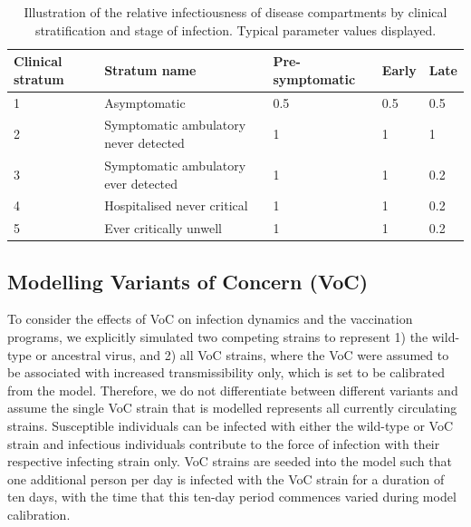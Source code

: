 \begin{table}[ht]
\renewcommand{\baselinestretch}{1}
    \begin{tabular}{| p{2cm} | p{6.6cm} | p{2.5cm} | l | l |}
    	\hline
        \textbf{Clinical stratum} & \textbf{Stratum name} & \textbf{Pre-symptomatic} &\textbf{Early} & \textbf{Late}\\
        \hline
        1 & Asymptomatic & \cellcolor[HTML]{DC6464}\textcolor[HTML]{FFFFFF}{0.5} & 
        \cellcolor[HTML]{DC6464}\textcolor[HTML]{FFFFFF}{0.5} & \cellcolor[HTML]{DC6464}\textcolor[HTML]{FFFFFF}{0.5} \\
        2 & Symptomatic ambulatory never detected & \cellcolor[HTML]{C90000}\textcolor[HTML]{FFFFFF}{1} & \cellcolor[HTML]{C90000}\textcolor[HTML]{FFFFFF}{1} & \cellcolor[HTML]{C90000}\textcolor[HTML]{FFFFFF}{1} \\
        3 & Symptomatic ambulatory ever detected & \cellcolor[HTML]{C90000}\textcolor[HTML]{FFFFFF}{1} & \cellcolor[HTML]{C90000}\textcolor[HTML]{FFFFFF}{1} & \cellcolor[HTML]{F0BEBE}\textcolor[HTML]{FFFFFF}{0.2} \\
        4 & Hospitalised never critical & \cellcolor[HTML]{C90000}\textcolor[HTML]{FFFFFF}{1} & \cellcolor[HTML]{C90000}\textcolor[HTML]{FFFFFF}{1} & \cellcolor[HTML]{F0BEBE}\textcolor[HTML]{FFFFFF}{0.2} \\
        5 & Ever critically unwell & 
        \cellcolor[HTML]{C90000}\textcolor[HTML]{FFFFFF}{1} & \cellcolor[HTML]{C90000}\textcolor[HTML]{FFFFFF}{1} & \cellcolor[HTML]{F0BEBE}\textcolor[HTML]{FFFFFF}{0.2} \\
        \hline
    \end{tabular}
    
    \caption{Illustration of the relative infectiousness of disease compartments by clinical stratification and stage of infection. Typical parameter values displayed.}
    \label{tab:clinical}
\end{table}

\subsection{Modelling Variants of Concern (VoC)}
To consider the effects of VoC on infection dynamics and the vaccination programs, we explicitly simulated two competing strains to represent 1) the wild-type or ancestral virus, and 2) all VoC strains, where the VoC were assumed to be associated with increased transmissibility only, which is set to be calibrated from the model. Therefore, we do not differentiate between different variants and assume the single VoC strain that is modelled represents all currently circulating strains. Susceptible individuals can be infected with either the wild-type or VoC strain and infectious individuals contribute to the force of infection with their respective infecting strain only. VoC strains are seeded into the model such that one additional person per day is infected with the VoC strain for a duration of ten days, with the time that this ten-day period commences varied during model calibration.
